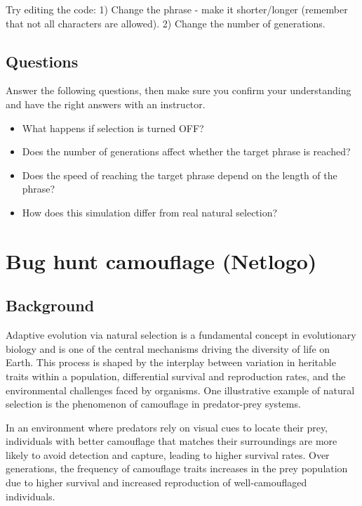 \documentclass[
  a4paper]{book}
\providecommand{\tightlist}{%
  \setlength{\itemsep}{0pt}\setlength{\parskip}{0pt}}
\begin{document}
Try editing the code:
1) Change the phrase - make it shorter/longer (remember that not all characters are allowed).
2) Change the number of generations.

\hypertarget{questions}{%
\section{Questions}\label{questions}}

Answer the following questions, then make sure you confirm your understanding and have the right answers with an instructor.

\begin{itemize}
\tightlist
\item
  What happens if selection is turned OFF?
\item
  Does the number of generations affect whether the target phrase is reached?
\item
  Does the speed of reaching the target phrase depend on the length of the phrase?
\item
  How does this simulation differ from real natural selection?
\end{itemize}

\hypertarget{bug-hunt-camouflage-netlogo}{%
\chapter{Bug hunt camouflage (Netlogo)}\label{bug-hunt-camouflage-netlogo}}

\hypertarget{background}{%
\section{Background}\label{background}}

Adaptive evolution via natural selection is a fundamental concept in evolutionary biology and is one of the central mechanisms driving the diversity of life on Earth. This process is shaped by the interplay between variation in heritable traits within a population, differential survival and reproduction rates, and the environmental challenges faced by organisms. One illustrative example of natural selection is the phenomenon of camouflage in predator-prey systems.

In an environment where predators rely on visual cues to locate their prey, individuals with better camouflage that matches their surroundings are more likely to avoid detection and capture, leading to higher survival rates. Over generations, the frequency of camouflage traits increases in the prey population due to higher survival and increased reproduction of well-camouflaged individuals.
\end{document}
